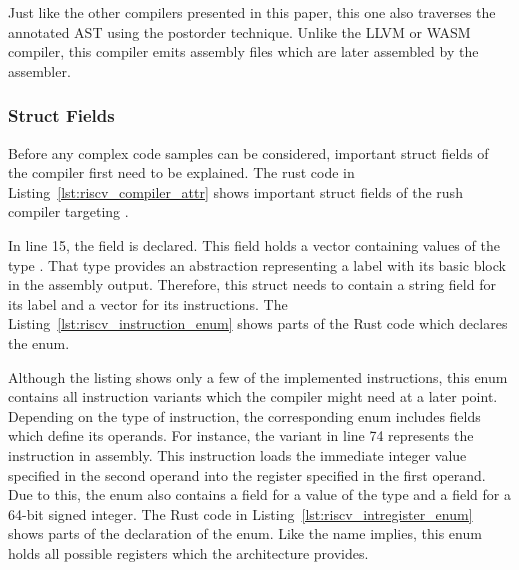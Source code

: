 Just like the other compilers presented in this paper, this one also traverses the annotated AST using the postorder technique.
Unlike the LLVM or WASM compiler, this compiler emits \riscv{} assembly files which are later assembled by the assembler.

\subsubsection{Struct Fields}

Before any complex code samples can be considered, important struct fields of the compiler first need to be explained.
The rust code in Listing~\ref{lst:riscv_compiler_attr} shows important struct fields of the rush compiler targeting \riscv{}.


In line 15, the field  is declared.
This field holds a vector containing values of the type .
That type provides an abstraction representing a label with its basic block in the assembly output.
Therefore, this struct needs to contain a string field for its label and a vector for its instructions.
The Listing~\ref{lst:riscv_instruction_enum} shows parts of the Rust code which declares the  enum.


Although the listing shows only a few of the implemented instructions, this enum contains all instruction variants which the compiler might need at a later point.
Depending on the type of instruction, the corresponding enum includes fields which define its operands.
For instance, the  variant in line 74 represents the  instruction in assembly.
This instruction loads the immediate integer value specified in the second operand into the register specified in the first operand.
Due to this, the enum also contains a field for a value of the type  and a field for a 64-bit signed integer.
The Rust code in Listing~\ref{lst:riscv_intregister_enum} shows parts of the declaration of the  enum.
Like the name implies, this enum holds all possible registers which the architecture provides.

